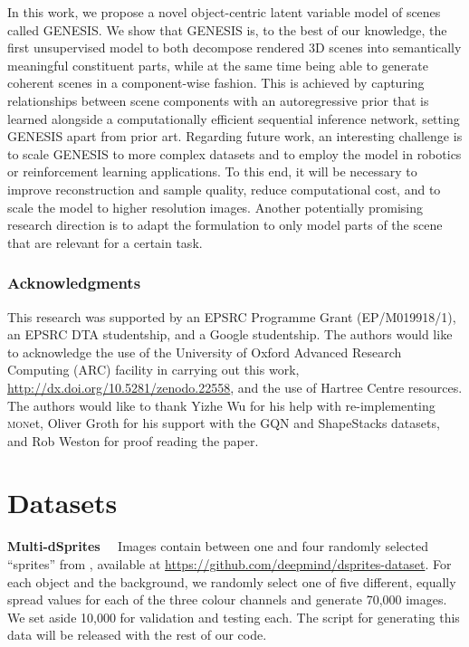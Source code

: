 \documentclass{article}
\begin{document}
In this work, we propose a novel object-centric latent variable model of  scenes called \gls{GENESIS}.
We show that \gls{GENESIS} is, to the best of our knowledge, the first unsupervised model to both decompose rendered 3D scenes into semantically meaningful constituent parts, while at the same time being able to generate coherent scenes in a component-wise fashion.
This is achieved by capturing relationships between scene components with an autoregressive prior that is learned alongside a computationally efficient sequential inference network, setting \gls{GENESIS} apart from prior art.
Regarding future work, an interesting challenge is to scale \gls{GENESIS} to more complex datasets and to employ the model in robotics or reinforcement learning applications.
To this end, it will be necessary to improve reconstruction and sample quality, reduce computational cost, and to scale the model to higher resolution images.
Another potentially promising research direction is to adapt the formulation to only model parts of the scene that are relevant for a certain task.
 
\clearpage


\subsubsection*{Acknowledgments}
This research was supported by an EPSRC Programme Grant (EP/M019918/1), an EPSRC DTA studentship, and a Google studentship.
The authors would like to acknowledge the use of the University of Oxford Advanced Research Computing (ARC) facility in carrying out this work, \url{http://dx.doi.org/10.5281/zenodo.22558}, and the use of Hartree Centre resources.
The authors would like to thank Yizhe Wu for his help with re-implementing \textsc{mon}et, Oliver Groth for his support with the GQN and ShapeStacks datasets, and Rob Weston for proof reading the paper.


  

\clearpage
\appendix


\section{Datasets}
\label{app:datasets}

\textbf{Multi-dSprites \citep{burgess2019monet}}\ \
Images contain between one and four randomly selected ``sprites'' from \citet{matthey2017dsprites}, available at \url{https://github.com/deepmind/dsprites-dataset}.
For each object and the background, we randomly select one of five different, equally spread values for each of the three colour channels and generate 70,000 images.
We set aside 10,000 for validation and testing each.
The script for generating this data will be released with the rest of our code.
\end{document}
